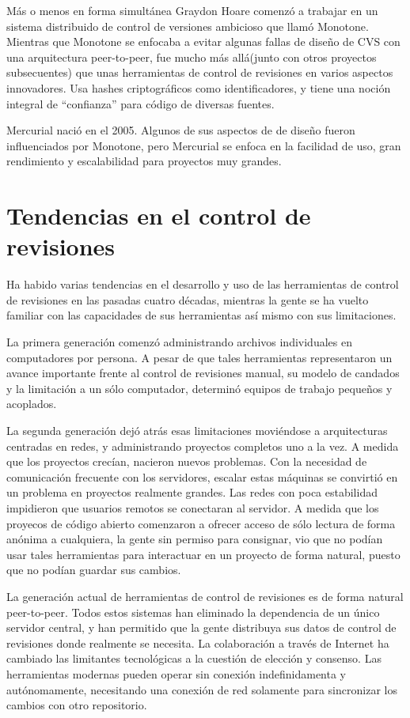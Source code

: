 Más o menos en forma simultánea Graydon Hoare comenzó a trabajar en un
sistema distribuido de control de versiones ambicioso que llamó
Monotone. Mientras que Monotone se enfocaba a evitar algunas fallas de
diseño de CVS con una arquitectura peer-to-peer, fue mucho más
allá(junto con otros proyectos subsecuentes) que unas herramientas de
control de revisiones en varios aspectos innovadores. Usa hashes
criptográficos como identificadores, y tiene una noción integral de 
``confianza'' para código de diversas fuentes.

Mercurial nació en el 2005.  Algunos de sus aspectos de de diseño
fueron influenciados por Monotone, pero Mercurial se enfoca en la
facilidad de uso, gran rendimiento y escalabilidad para proyectos muy
grandes.

\section{Tendencias en el control de revisiones}

Ha habido varias tendencias en el desarrollo y uso de las herramientas
de control de revisiones en las pasadas cuatro décadas, mientras la
gente se ha vuelto familiar con las capacidades de sus herramientas
así mismo con sus limitaciones.

La primera generación comenzó administrando archivos individuales en
computadores por persona. A pesar de que tales herramientas
representaron un avance importante frente al control de revisiones
manual, su modelo de candados y la limitación a un sólo computador,
determinó equipos de trabajo pequeños y acoplados.

La segunda generación dejó atrás esas limitaciones moviéndose a
arquitecturas centradas en  redes, y administrando proyectos completos
uno a la vez. A medida que los proyectos crecían, nacieron nuevos
problemas. Con la necesidad de comunicación frecuente con los
servidores, escalar estas máquinas se convirtió en un problema en
proyectos realmente grandes. Las redes con poca estabilidad impidieron
que usuarios remotos se conectaran al servidor. A medida que los
proyecos de código abierto comenzaron a ofrecer acceso de sólo lectura
de forma anónima a cualquiera, la gente sin permiso para consignar,
vio que no podían usar tales herramientas para interactuar en un
proyecto de forma natural, puesto que no podían guardar sus cambios.

La generación actual de herramientas de control de revisiones es de
forma natural peer-to-peer.  Todos estos sistemas han eliminado la
dependencia de un único servidor central, y han permitido que la
gente distribuya sus datos de control de revisiones donde realmente se
necesita. La colaboración a través de Internet ha cambiado las
limitantes tecnológicas a la cuestión de elección y consenso. Las
herramientas modernas pueden operar sin conexión indefinidamenta y
autónomamente, necesitando una conexión de red solamente para
sincronizar los cambios con otro repositorio.

